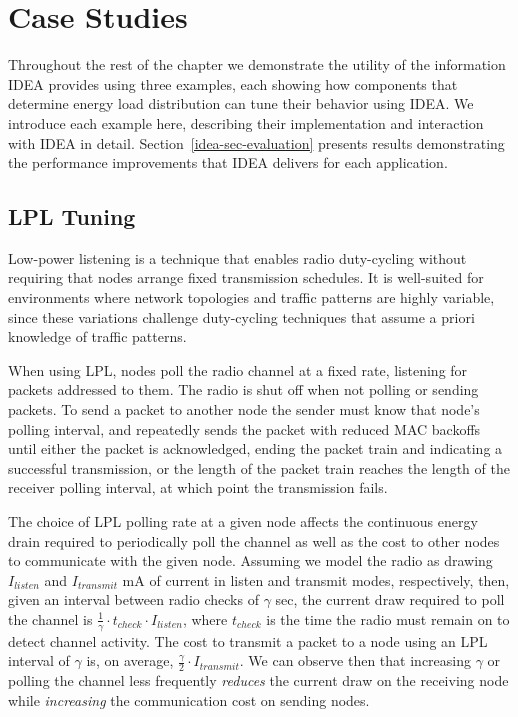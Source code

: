 \section{Case Studies}
\label{idea-sec-casestudies}

Throughout the rest of the chapter we demonstrate the utility of the
information IDEA provides using three examples, each showing how components
that determine energy load distribution can tune their behavior using IDEA.
We introduce each example here, describing their implementation and
interaction with IDEA in detail. Section~\ref{idea-sec-evaluation} presents
results demonstrating the performance improvements that IDEA delivers for
each application.

\subsection{LPL Tuning}
\label{idea-subsec-lpltuning}

Low-power listening is a technique that enables radio duty-cycling without
requiring that nodes arrange fixed transmission schedules. It is well-suited
for environments where network topologies and traffic patterns are highly
variable, since these variations challenge duty-cycling techniques that
assume a priori knowledge of traffic patterns.

When using LPL, nodes poll the radio channel at a fixed rate, listening for
packets addressed to them. The radio is shut off when not polling or sending
packets. To send a packet to another node the sender must know that node's
polling interval, and repeatedly sends the packet with reduced MAC backoffs
until either the packet is acknowledged, ending the packet train and
indicating a successful transmission, or the length of the packet train
reaches the length of the receiver polling interval, at which point the
transmission fails.

The choice of LPL polling rate at a given node affects the continuous energy
drain required to periodically poll the channel as well as the cost to other
nodes to communicate with the given node. Assuming we model the radio as
drawing $I_{listen}$ and $I_{transmit}$ mA of current in listen and transmit
modes, respectively, then, given an interval between radio checks of $\gamma$
sec, the current draw required to poll the channel is $\frac{1}{\gamma} \cdot
t_{check} \cdot I_{listen}$, where $t_{check}$ is the time the radio must
remain on to detect channel activity. The cost to transmit a packet to a node
using an LPL interval of $\gamma$ is, on average, $\frac{\gamma}{2} \cdot
I_{transmit}$. We can observe then that increasing $\gamma$ or polling the
channel less frequently \textit{reduces} the current draw on the receiving
node while \textit{increasing} the communication cost on sending nodes.

